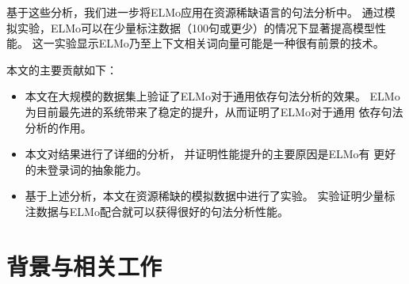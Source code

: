 基于这些分析，我们进一步将ELMo应用在资源稀缺语言的句法分析中。
通过模拟实验，ELMo可以在少量标注数据（100句或更少）的情况下显著提高模型性能。
这一实验显示ELMo乃至上下文相关词向量可能是一种很有前景的技术。

本文的主要贡献如下：
\begin{itemize}
	\item 本文在大规模的数据集上验证了ELMo对于通用依存句法分析的效果。
	ELMo为目前最先进的系统带来了稳定的提升，从而证明了ELMo对于通用
	依存句法分析的作用。
	\item 本文对结果进行了详细的分析，
	并证明性能提升的主要原因是ELMo有
	更好的未登录词的抽象能力。
	\item 基于上述分析，本文在资源稀缺的模拟数据中进行了实验。
	实验证明少量标注数据与ELMo配合就可以获得很好的句法分析性能。
\end{itemize}


\section{背景与相关工作}

